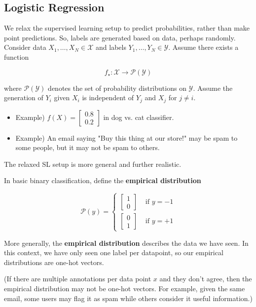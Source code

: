 \documentclass{report}
\begin{document}
\subsection{Logistic Regression}

\begin{concept}
    We relax the supervised learning setup to predict probabilities, rather than make point predictions.
    So, labels are generated based on data, perhaps randomly.
    Consider data $X_{1}, \ldots, X_{N} \in \mathcal{X}$ and labels $Y_{1}, \ldots, Y_{N} \in \mathcal{Y}$. Assume there exists a function

    $$
    f_{\star}: \mathcal{X} \rightarrow \mathcal{P}(\mathcal{Y})
    $$

    where $\mathcal{P}(\mathcal{Y})$ denotes the set of probability distributions on $\mathcal{Y}$.
    Assume the generation of $Y_{i}$ given $X_{i}$ is independent of $Y_{j}$ and $X_{j}$ for $j \neq i$.

    \begin{itemize}
        \item Example) $f(X)=\left[\begin{array}{l}0.8 \\ 0.2\end{array}\right]$ in dog vs. cat classifier.
        \item Example) An email saying "Buy this thing at our store!" may be spam to some people, but it may not be spam to others.
    \end{itemize}

    The relaxed SL setup is more general and further realistic.
\end{concept}

\begin{definition}
    In basic binary classification, define the \textbf{empirical distribution}

    $$
    \mathcal{P}(y)= \begin{cases}{\left[\begin{array}{l}
    1 \\
    0
    \end{array}\right]} & \text { if } y=-1 \\
    {\left[\begin{array}{l}
    0 \\
    1
    \end{array}\right]} & \text { if } y=+1\end{cases}
    $$

    More generally, the \textbf{empirical distribution} describes the data we have seen.
    In this context, we have only seen one label per datapoint, so our empirical distributions are one-hot vectors.

    (If there are multiple annotations per data point $x$ and they don't agree, then the empirical distribution may not be one-hot vectors.
    For example, given the same email, some users may flag it as spam while others consider it useful information.)
\end{definition}
\end{document}
